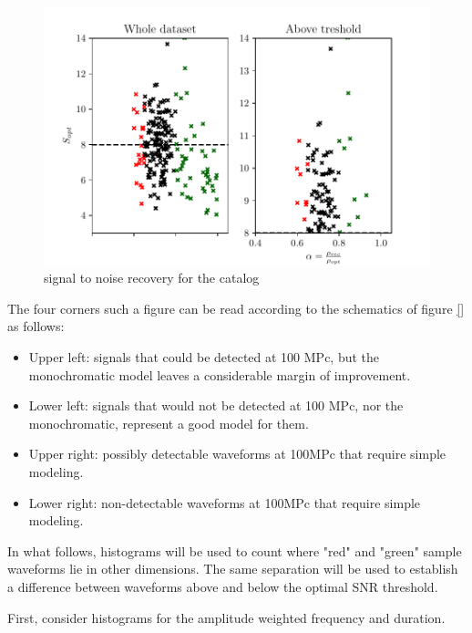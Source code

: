 \begin{figure}[hbt!]
\begin{center}
\includegraphics[width=\textwidth, angle=0]{images/Data_analysis/results/alpha_scatter.pdf}
\caption{signal to noise recovery for the catalog}
\label{ascatter}
\end{center}
\end{figure}

\FloatBarrier


The four corners such a figure can be read according to the schematics of figure \ref{} as follows:

\begin{itemize}
\item Upper left: signals that could be detected at 100 MPc, but the monochromatic model leaves a considerable margin of improvement.
\item Lower left: signals that would not be detected at 100 MPc, nor the monochromatic, represent a good model for them.
\item 
Upper right: possibly detectable waveforms at 100MPc that require simple modeling.
\item 
Lower right: non-detectable waveforms at 100MPc that require simple modeling.
\end{itemize}

\newpage

In what follows, histograms will be used to count where   "red" and "green" sample waveforms lie in other dimensions. The same separation will be used to establish a difference between waveforms above and below the optimal SNR threshold.

First, consider histograms for the amplitude weighted frequency and duration.

